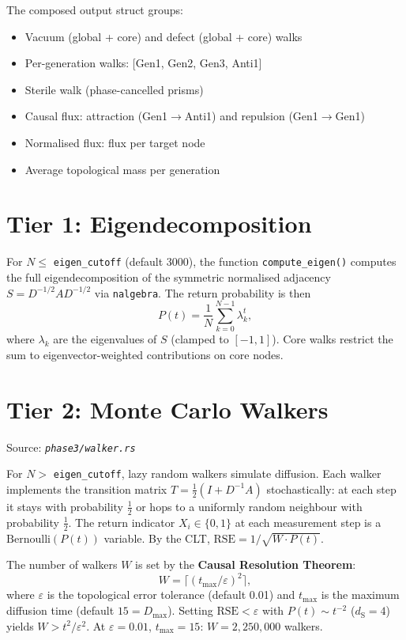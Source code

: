 \documentclass[11pt, a4paper, openany]{book}
\newcommand{\dS}{d_{\mathrm{S}}}
\newcommand{\code}[1]{\texttt{#1}}
\newcommand{\func}[1]{\texttt{\color{structure}#1}}
\newcommand{\file}[1]{\texttt{\itshape #1}}
\begin{document}
\begin{definition}[SpectralOutput]
  The composed output struct groups:
  \begin{itemize}
    \item Vacuum (global + core) and defect (global + core) walks
    \item Per-generation walks: [Gen1, Gen2, Gen3, Anti1]
    \item Sterile walk (phase-cancelled prisms)
    \item Causal flux: attraction (Gen1$\to$Anti1) and repulsion (Gen1$\to$Gen1)
    \item Normalised flux: flux per target node
    \item Average topological mass per generation
  \end{itemize}
\end{definition}

\section{Tier 1: Eigendecomposition}

For $N \leq$ \code{eigen\_cutoff} (default 3000), the function
\func{compute\_eigen()} computes the full eigendecomposition of the symmetric
normalised adjacency $S = D^{-1/2}AD^{-1/2}$ via \code{nalgebra}.  The
return probability is then
\[
  P(t) = \frac{1}{N}\sum_{k=0}^{N-1} \lambda_k^{t},
\]
where $\lambda_k$ are the eigenvalues of $S$ (clamped to $[-1,1]$).
Core walks restrict the sum to eigenvector-weighted contributions on core nodes.

\section{Tier 2: Monte Carlo Walkers}

Source: \file{phase3/walker.rs}

For $N >$ \code{eigen\_cutoff}, lazy random walkers simulate diffusion.  Each
walker implements the transition matrix $T = \frac{1}{2}(I + D^{-1}A)$
stochastically: at each step it stays with probability $\frac{1}{2}$ or hops to
a uniformly random neighbour with probability $\frac{1}{2}$.  The return
indicator $X_i \in \{0,1\}$ at each measurement step is a $\mathrm{Bernoulli}(P(t))$
variable.  By the CLT, $\mathrm{RSE} = 1/\sqrt{W \cdot P(t)}$.

The number of walkers $W$ is set by the \textbf{Causal Resolution Theorem}:
\[
  W = \lceil (t_{\max} / \varepsilon)^2 \rceil,
\]
where $\varepsilon$ is the topological error tolerance (default 0.01) and
$t_{\max}$ is the maximum diffusion time (default $15 = D_{\max}$).  Setting
$\mathrm{RSE} < \varepsilon$ with $P(t) \sim t^{-2}$ ($\dS = 4$) yields
$W > t^2/\varepsilon^2$.  At $\varepsilon = 0.01$, $t_{\max} = 15$:
$W = 2{,}250{,}000$ walkers.
\end{document}
